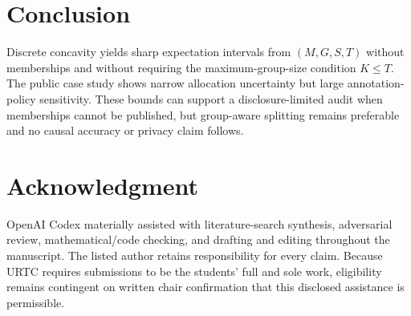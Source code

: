 \documentclass[conference,10pt]{IEEEtran}
\begin{document}
\section{Conclusion}
Discrete concavity yields sharp expectation intervals from $(M,G,S,T)$ without memberships and without requiring the maximum-group-size condition $K\leq T$. The public case study shows narrow allocation uncertainty but large annotation-policy sensitivity. These bounds can support a disclosure-limited audit when memberships cannot be published, but group-aware splitting remains preferable and no causal accuracy or privacy claim follows.

\section*{Acknowledgment}
OpenAI Codex materially assisted with literature-search synthesis, adversarial review, mathematical/code checking, and drafting and editing throughout the manuscript. The listed author retains responsibility for every claim. Because URTC requires submissions to be the students' full and sole work, eligibility remains contingent on written chair confirmation that this disclosed assistance is permissible.



\end{document}
